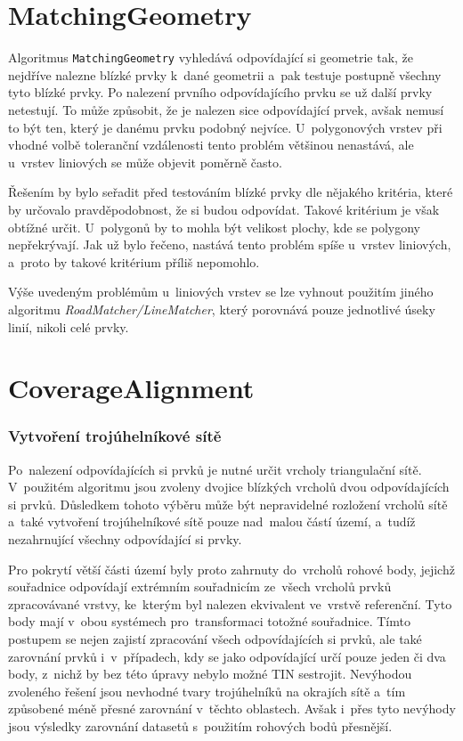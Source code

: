 \section{MatchingGeometry}
\label{problemy-mg}

Algoritmus \texttt{MatchingGeometry} vyhledává odpovídající si geometrie tak,
že nejdříve nalezne blízké prvky k~dané geometrii a~pak testuje postupně všechny
tyto blízké prvky. Po nalezení prvního odpovídajícího prvku se už další prvky
netestují. To může způsobit, že je nalezen sice odpovídající prvek, avšak
nemusí to být ten, který je danému prvku podobný nejvíce. U~polygonových vrstev
při vhodné volbě toleranční vzdálenosti tento problém většinou nenastává, 
ale u~vrstev liniových se může objevit poměrně často. 

Řešením by bylo seřadit před testováním blízké prvky dle nějakého
kritéria, které by určovalo pravděpodobnost, že si budou odpovídat. Takové
kritérium je však obtížné určit. U~polygonů by to mohla být velikost plochy,
kde se polygony nepřekrývají. Jak už bylo řečeno, nastává tento problém
spíše u~vrstev liniových, a~proto by takové kritérium příliš nepomohlo.


Výše uvedeným problémům u~liniových vrstev se lze vyhnout použitím jiného
algoritmu \textit{RoadMatcher/LineMatcher}, který porovnává pouze jednotlivé
úseky linií, nikoli celé prvky. 

\section{CoverageAlignment}
\label{problemy-ca}

\subsubsection{Vytvoření trojúhelníkové sítě}
Po~nalezení odpovídajících si prvků je nutné určit vrcholy triangulační sítě.
V~použitém algoritmu jsou zvoleny dvojice blízkých vrcholů dvou odpovídajících
si prvků. Důsledkem tohoto výběru může být nepravidelné rozložení vrcholů sítě
a~také vytvoření troj\-úhelníkové sítě pouze nad~malou částí území, a~tudíž 
nezahrnující všechny odpovídající si prvky.

Pro pokrytí větší části území byly proto zahrnuty do~vrcholů rohové body, jejichž
souřadnice odpovídají extrémním souřadnicím ze~všech vrcholů prvků zpracovávané 
vrstvy, ke~kterým byl nalezen ekvivalent ve~vrstvě referenční. Tyto body mají 
v~obou systémech pro~transformaci totožné souřadnice. Tímto postupem se nejen 
zajistí zpracování všech odpovídajících si prvků, ale také zarovnání prvků 
i~v~případech, kdy se jako odpovídající určí pouze jeden či dva body, z~nichž 
by bez této úpravy nebylo možné TIN sestrojit. Nevýhodou zvoleného řešení jsou 
nevhodné tvary trojúhelníků na okrajích sítě a~tím způsobené méně přesné zarovnání 
v~těchto oblastech. Avšak i~přes tyto nevýhody jsou výsledky zarovnání datasetů 
s~použitím rohových bodů přesnější. 

